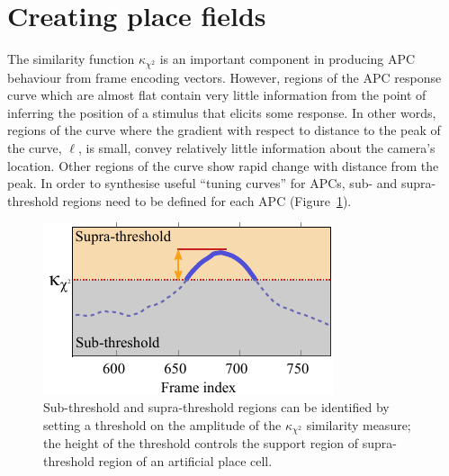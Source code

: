\section{Creating place fields}

The similarity function $\kappa_{\chi^2}$ is an important component in producing APC behaviour from frame encoding vectors.  However, regions of the APC response curve which are almost flat contain very little information from the point of inferring the position of a stimulus that elicits some response. In other words, regions of the curve where the gradient with respect to distance to the peak of the curve, $\ell$, is small, convey relatively little information about the camera's location. Other regions of the curve show rapid change with distance from the peak. In order to synthesise useful ``tuning curves'' for APCs, sub- and supra-threshold regions need to be defined for each APC (Figure~\ref{fig:Supra}).

\begin{figure}
\centering
  \includegraphics[width=.8\linewidth]{gfx/Chapter05/tuning_curve-thresh.pdf}
\caption{Sub-threshold and supra-threshold regions can be identified by setting a threshold on the amplitude of the $\kappa_{\chi^2}$ similarity measure; the height of the threshold controls the support region of supra-threshold region of an artificial place cell.}
\label{fig:Supra}
\end{figure}




